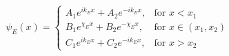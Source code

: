 \[
\psi_E(x)=
\begin{cases}
    A_{1}e^{ik_{E}x} + A_{2}e^{-ik_{E}x}, & \text{for } x < x_1 \\
    B_{1}e^{\chi_{E}x} + B_{2}e^{-\chi_{E}x}, & \text{for } x \in (x_1, x_2) \\
    C_{1}e^{ik_{E}x} + C_{2}e^{-ik_{E}x}, & \text{for } x > x_2
\end{cases}
\]
